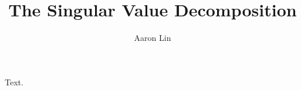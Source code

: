 \documentclass[lang=zh, titleinfo=line]{akizumi-note}
\title{The Singular Value Decomposition}
\author{Aaron Lin}
\begin{document}
\maketitle
Text.
\end{document}
